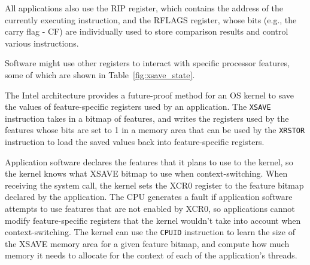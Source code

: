 All applications also use the RIP register, which contains the address of the
currently executing instruction, and the RFLAGS register, whose bits (e.g.,
the carry flag - CF) are individually used to store comparison results and
control various instructions.


Software might use other registers to interact with specific processor
features, some of which are shown in Table~\ref{fig:xsave_state}.

\begin{table}[hbt]
  \caption{Sample feature-specific Intel architecture registers.}
  \label{fig:xsave_state}
\end{table}

The Intel architecture provides a future-proof method for an OS kernel to save
the values of feature-specific registers used by an application. The
\texttt{XSAVE} instruction takes in a bitmap of features, and writes the
registers used by the features whose bits are set to 1 in a memory area that
can be used by the \texttt{XRSTOR} instruction to load the saved values back
into feature-specific registers.

Application software declares the features that it plans to use to the kernel,
so the kernel knows what XSAVE bitmap to use when context-switching. When
receiving the system call, the kernel sets the XCR0 register to the feature
bitmap declared by the application. The CPU generates a fault if application
software attempts to use features that are not enabled by XCR0, so applications
cannot modify feature-specific registers that the kernel wouldn't take into
account when context-switching. The kernel can use the \texttt{CPUID}
instruction to learn the size of the XSAVE memory area for a given feature
bitmap, and compute how much memory it needs to allocate for the context of
each of the application's threads.
